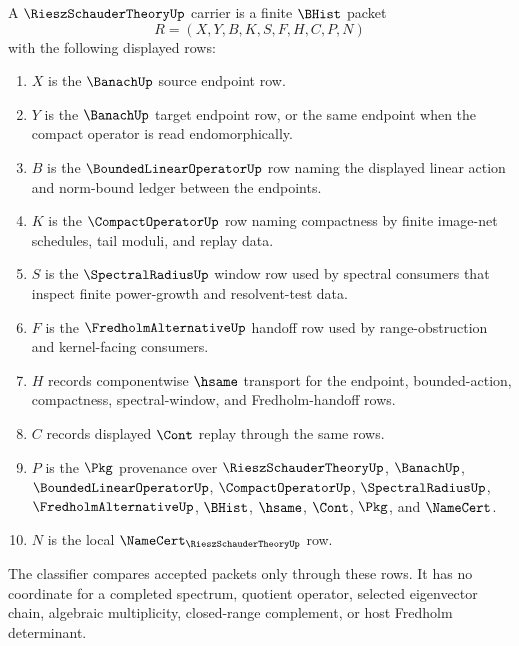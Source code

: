 \begin{definition}
\label{def:riesz-schauder-theory-carrier}
A $\RieszSchauderTheoryUp$ carrier is a finite $\BHist$ packet
$$
R=(X,Y,B,K,S,F,H,C,P,N)
$$
with the following displayed rows:
\begin{enumerate}
\item $X$ is the $\BanachUp$ source endpoint row.
\item $Y$ is the $\BanachUp$ target endpoint row, or the same endpoint when the compact operator is read endomorphically.
\item $B$ is the $\BoundedLinearOperatorUp$ row naming the displayed linear action and norm-bound ledger between the endpoints.
\item $K$ is the $\CompactOperatorUp$ row naming compactness by finite image-net schedules, tail moduli, and replay data.
\item $S$ is the $\SpectralRadiusUp$ window row used by spectral consumers that inspect finite power-growth and resolvent-test data.
\item $F$ is the $\FredholmAlternativeUp$ handoff row used by range-obstruction and kernel-facing consumers.
\item $H$ records componentwise $\hsame$ transport for the endpoint, bounded-action, compactness, spectral-window, and Fredholm-handoff rows.
\item $C$ records displayed $\Cont$ replay through the same rows.
\item $P$ is the $\Pkg$ provenance over $\RieszSchauderTheoryUp$, $\BanachUp$, $\BoundedLinearOperatorUp$, $\CompactOperatorUp$, $\SpectralRadiusUp$, $\FredholmAlternativeUp$, $\BHist$, $\hsame$, $\Cont$, $\Pkg$, and $\NameCert$.
\item $N$ is the local $\NameCert_{\RieszSchauderTheoryUp}$ row.
\end{enumerate}
The classifier compares accepted packets only through these rows. It has no coordinate for a completed spectrum, quotient operator, selected eigenvector chain, algebraic multiplicity, closed-range complement, or host Fredholm determinant.
\end{definition}

